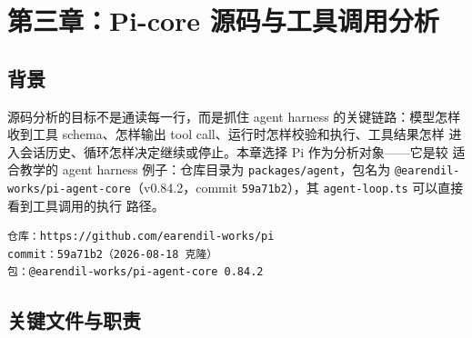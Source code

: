 \clearpage
\section{第三章：Pi-core 源码与工具调用分析}

\subsection{背景}

源码分析的目标不是通读每一行，而是抓住 agent harness 的关键链路：模型怎样
收到工具 schema、怎样输出 tool call、运行时怎样校验和执行、工具结果怎样
进入会话历史、循环怎样决定继续或停止。本章选择 Pi 作为分析对象——它是较
适合教学的 agent harness 例子：仓库目录为 \texttt{packages/agent}，包名为
\texttt{@earendil-works/pi-agent-core}（v0.84.2，commit
\texttt{59a71b2}），其 \texttt{agent-loop.ts} 可以直接看到工具调用的执行
路径。

\begin{verbatim}
仓库：https://github.com/earendil-works/pi
commit：59a71b2（2026-08-18 克隆）
包：@earendil-works/pi-agent-core 0.84.2
\end{verbatim}

\subsection{关键文件与职责}

